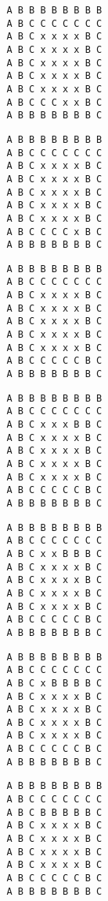 { \begin{verbatim}
         A B B B B B B B B
         A B C C C C C C C
         A B C x x x x B C
         A B C x x x x B C
         A B C x x x x B C
         A B C x x x x B C
         A B C x x x x B C
         A B C C C x x B C
         A B B B B B B B C
\end{verbatim} }

{ \begin{verbatim}
         A B B B B B B B B
         A B C C C C C C C
         A B C x x x x B C
         A B C x x x x B C
         A B C x x x x B C
         A B C x x x x B C
         A B C x x x x B C
         A B C C C C x B C
         A B B B B B B B C
\end{verbatim} }

{ \begin{verbatim}
         A B B B B B B B B
         A B C C C C C C C
         A B C x x x x B C
         A B C x x x x B C
         A B C x x x x B C
         A B C x x x x B C
         A B C x x x x B C
         A B C C C C C B C
         A B B B B B B B C
\end{verbatim} }

{ \begin{verbatim}
         A B B B B B B B B
         A B C C C C C C C
         A B C x x x B B C
         A B C x x x x B C
         A B C x x x x B C
         A B C x x x x B C
         A B C x x x x B C
         A B C C C C C B C
         A B B B B B B B C
\end{verbatim} }

{ \begin{verbatim}
         A B B B B B B B B
         A B C C C C C C C
         A B C x x B B B C
         A B C x x x x B C
         A B C x x x x B C
         A B C x x x x B C
         A B C x x x x B C
         A B C C C C C B C
         A B B B B B B B C
\end{verbatim} }

{ \begin{verbatim}
         A B B B B B B B B
         A B C C C C C C C
         A B C x B B B B C
         A B C x x x x B C
         A B C x x x x B C
         A B C x x x x B C
         A B C x x x x B C
         A B C C C C C B C
         A B B B B B B B C
\end{verbatim} }

{ \begin{verbatim}
         A B B B B B B B B
         A B C C C C C C C
         A B C B B B B B C
         A B C x x x x B C
         A B C x x x x B C
         A B C x x x x B C
         A B C x x x x B C
         A B C C C C C B C
         A B B B B B B B C
\end{verbatim} }

